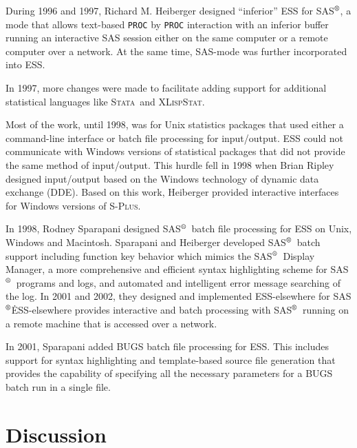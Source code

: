 \documentclass{article}
\newcommand*{\SAS}{\textsc{SAS}$^{\mbox{\scriptsize\textregistered}}$}
\newcommand*{\Splus}{\textsc{S-Plus}}
\newcommand*{\XLispStat}{\textsc{XLispStat}}
\newcommand*{\Stata}{\textsc{Stata}}
\newcommand{\stexttt}[1]{{\small\texttt{#1}}}
\begin{document}
During 1996 and 1997, Richard M. Heiberger designed ``inferior'' ESS
for \SAS, a mode that allows text-based \stexttt{PROC} by
\stexttt{PROC} interaction with an inferior buffer running an interactive SAS
session either on the same computer or a remote computer over a network.
At the same time, SAS-mode was further incorporated into ESS.

In 1997, more changes were made to facilitate
adding support for additional statistical languages like \Stata\ and
\XLispStat.

Most of the work, until 1998, was for Unix statistics
packages that used either a command-line interface or batch file
processing for input/output.  ESS could not communicate
with Windows versions of statistical packages that did not provide
the same method of input/output.  This hurdle
fell in 1998 when Brian Ripley designed input/output based on
the Windows technology of dynamic data exchange (DDE).
Based on this work, Heiberger provided interactive interfaces
for Windows versions of \Splus.

In 1998, Rodney Sparapani designed \SAS\ batch file processing for ESS
on Unix, Windows and Macintosh.
Sparapani and Heiberger developed \SAS\ batch support including function
key behavior which mimics the \SAS\ Display Manager,
a more comprehensive and efficient syntax highlighting scheme for \SAS\
programs and logs, and automated and intelligent error message searching
of the log.  In 2001 and 2002, they designed and implemented ESS-elsewhere
for \SAS\.  ESS-elsewhere provides interactive and batch processing
with \SAS\ running on a remote machine that is accessed over a
network.

In 2001, Sparapani added BUGS batch file processing for ESS.  This
includes support for syntax highlighting and template-based source file
generation that provides the capability of specifying all the necessary
parameters for a BUGS batch run in a single file.

\section{Discussion}
\label{sec:discussion}
\end{document}
